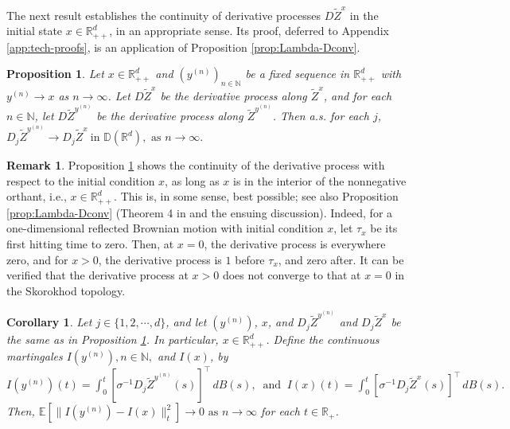 \documentclass[11pt]{article}
\theoremstyle{definition}
\newtheorem{remark}[assumption]{Remark}
\theoremstyle{plain}
\newtheorem{proposition}[assumption]{Proposition}
\newtheorem{corollary}[assumption]{Corollary}
\newcommand{\R}{\mathbb{R}}
\newcommand{\D}{\mathbb{D}}
\begin{document}
The next result establishes the continuity of derivative processes \( D\tilde{Z}^x \) in the initial state \( x \in \mathbb{R}_{++}^d \), 
in an appropriate sense. Its proof, deferred to Appendix \ref{app:tech-proofs}, is an application of Proposition \ref{prop:Lambda-Dconv}.
\begin{proposition}\label{thm:continuity-DZ}
Let \( x \in \mathbb{R}_{++}^d \) and \( (y^{(n)})_{n \in \mathbb{N}} \) be a fixed sequence in \( \mathbb{R}_{++}^d \) with \( y^{(n)} \to x \) as \( n \to \infty \).  
Let \( D\tilde{Z}^x \) be the derivative process along \( \tilde{Z}^x \), and for each \( n \in \mathbb{N} \),  
let \( D\tilde{Z}^{y^{(n)}} \) be the derivative process along \( \tilde{Z}^{y^{(n)}} \).  
Then a.s. for each $j$, 
\(
D_j\tilde{Z}^{y^{(n)}} \to D_j\tilde{Z}^x \ \text{in } \D(\mathbb{R}^d), \text{ as } n \to \infty.
\)
\end{proposition}

\begin{remark}\label{rm:continuity}
Proposition \ref{thm:continuity-DZ} shows the continuity of the derivative process with respect to the initial condition $x$, 
as long as $x$ is in the interior of the nonnegative orthant, i.e., $x \in \R_{++}^d$. 
This is, in some sense, best possible; see also Proposition \ref{prop:Lambda-Dconv} (Theorem 4 in \cite{LipshutzRamanan2019a} 
and the ensuing discussion). Indeed, for a one-dimensional reflected Brownian motion with initial condition $x$, 
let $\tau_x$ be its first hitting time to zero. 
Then, at $x=0$, the derivative process is everywhere zero, and for $x>0$, the derivative process is $1$ before $\tau_x$, 
and zero after. It can be verified that the derivative process at $x>0$ does not converge to that at $x=0$ in the Skorokhod topology. 
\end{remark}
\begin{corollary}\label{cor:conv-bel}
Let $j \in \{1, 2, \cdots, d\}$, and let \( (y^{(n)}) \), $x$, and \( D_j\tilde{Z}^{y^{(n)}} \) and \( D_j\tilde{Z}^x \) be the same as in Proposition \ref{thm:continuity-DZ}. 
In particular, $x \in \R_{++}^d$.
Define the continuous martingales
\( I(y^{(n)}), n \in \mathbb{N}, \) and \( I(x) \), by
\(
I(y^{(n)})(t) = \int_0^t \left[\sigma^{-1} D_j\tilde Z^{y^{(n)}}(s)\right]^{\top} \, dB(s),\ \text{ and } \ I(x)(t) = \int_0^t \left[\sigma^{-1} D_j\tilde Z^x(s)\right]^{\top} \, dB(s).
\)
Then, \( \mathbb{E} \left[ \|I(y^{(n)}) - I(x)\|_t^2 \right] \to 0 \text{ as } n \to \infty \)
for each \( t \in \mathbb{R}_+ \).
\end{corollary}
\end{document}
